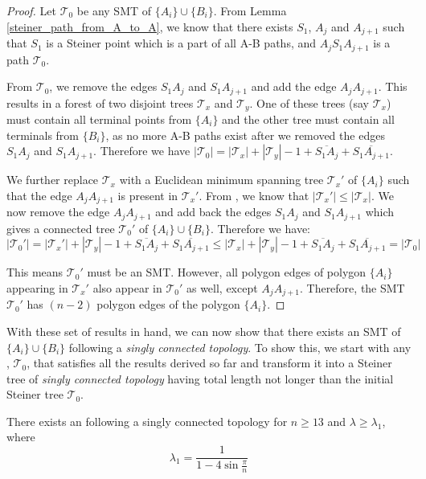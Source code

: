 \begin{proof}
    Let $\mathcal T_0$ be any SMT of $\{A_i\} \cup \{B_i\}$. From Lemma \ref{steiner_path_from_A_to_A}, we know that there exists $S_1$, $A_j$ and $A_{j + 1}$ such that $S_1$ is a Steiner point which is a part of all A-B paths, and $A_jS_1A_{j+1}$ is a path $\mathcal T_0$.

    From $\mathcal T_0$, we remove the edges $S_1A_j$ and $S_1A_{j + 1}$ and add the edge $A_jA_{j+1}$. This results in a forest of two disjoint trees $\mathcal T_x$ and $\mathcal T_y$. One of these trees (say $\mathcal T_x$) must contain all terminal points from $\{A_i\}$ and the other tree must contain all terminals from $\{B_i\}$, as no more A-B paths exist after we removed the edges $S_1A_j$ and $S_1A_{j+1}$. Therefore we have $|\mathcal T_0| = |\mathcal T_x| + |\mathcal T_y| - 1 + \overline{S_1A_j} + \overline{S_1A_{j+1}}$.

    We further replace $\mathcal T_x$ with a Euclidean minimum spanning tree $\mathcal T_x'$ of $\{A_i\}$ such that the edge $A_jA_{j+1}$ is present in $\mathcal T_x'$. From \cite{du1987steiner}, we know that $|\mathcal T_x'| \le |\mathcal T_x|$. We now remove the edge $A_jA_{j+1}$ and add back the edges $S_1A_j$ and $S_1A_{j+1}$ which gives a connected tree $\mathcal T_0'$ of $\{A_i\} \cup \{B_i\}$. Therefore we have:
    $$|\mathcal T_0'| = |\mathcal T_x'| + |\mathcal T_y| - 1 + \overline{S_1A_j} + \overline{S_1A_{j+1}} \le |\mathcal T_x| + |\mathcal T_y| - 1 + \overline{S_1A_j} + \overline{S_1A_{j+1}} = |\mathcal T_0|$$

    This means $\mathcal T_0'$ must be an SMT. However, all polygon edges of polygon $\{A_i\}$ appearing in $\mathcal T_x'$ also appear in $\mathcal T_0'$ as well, except $A_jA_{j+1}$. Therefore, the SMT $\mathcal T_0'$ has $(n - 2)$ polygon edges of the polygon $\{A_i\}$.
\end{proof}

With these set of results in hand, we can now show that there exists an SMT of $\{A_i\} \cup \{B_i\}$ following a \emph{singly connected topology}. To show this, we start with any \smtpoly, $\mathcal T_0$, that satisfies all the results derived so far and transform it into a Steiner tree of \emph{singly connected topology} having total length not longer than the initial Steiner tree $\mathcal T_0$.

\begin{theorem} \label{final_proof}
There exists an \smtpoly following a singly connected topology for $n \ge 13$ and $\lambda \ge \lambda_{1}$, where
$$
\lambda_{1} = \frac{1}{1 - 4 \sin \frac{\pi}{n}}
$$
\end{theorem}

